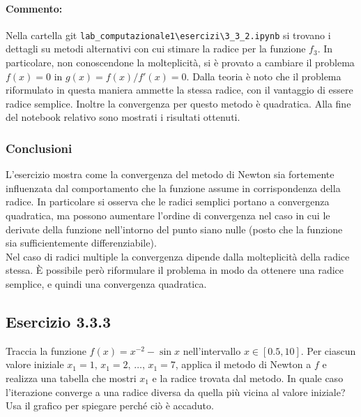 \documentclass[letterpaper, 12pt]{article}
\numberwithin{equation}{section}    %
\begin{document}
\paragraph{Commento:}Nella cartella git \verb|lab_computazionale1\esercizi\3_3_2.ipynb| si trovano i dettagli
su metodi alternativi con cui stimare la radice per la funzione $f_3$. In particolare, non conoscendone la 
molteplicità, si è provato a cambiare il problema $f(x) = 0$ in $g(x) = f(x)/f'(x) = 0$. Dalla teoria è noto che il 
problema riformulato in questa maniera ammette la stessa radice, con il vantaggio di essere radice semplice. 
Inoltre la convergenza per questo metodo è quadratica. Alla fine del notebook relativo sono mostrati 
i risultati ottenuti.

\subsubsection{Conclusioni}
L'esercizio mostra come la convergenza del metodo di Newton sia fortemente influenzata dal comportamento che 
la funzione assume in corrispondenza della radice. In particolare si osserva che le radici semplici portano a
convergenza quadratica, ma possono aumentare l'ordine di convergenza nel caso in cui le derivate della
funzione nell'intorno del punto siano nulle (posto che la funzione sia sufficientemente differenziabile). \\
Nel caso di radici multiple la convergenza dipende dalla molteplicità della radice stessa. È possibile però
riformulare il problema in modo da ottenere una radice semplice, e quindi una convergenza quadratica.

\subsection{Esercizio 3.3.3}
\label{sec:333}
Traccia la funzione $f(x)=x^{-2} - \sin x$ nell'intervallo $x \in [0.5,10]$.  
Per ciascun valore iniziale $x_1=1,\, x_1=2,\,\ldots,\, x_1=7$, applica il metodo di Newton a $f$  
e realizza una tabella che mostri $x_1$ e la radice trovata dal metodo.  
In quale caso l'iterazione converge a una radice diversa da quella più vicina al valore iniziale?  
Usa il grafico per spiegare perché ciò è accaduto.
\end{document}
